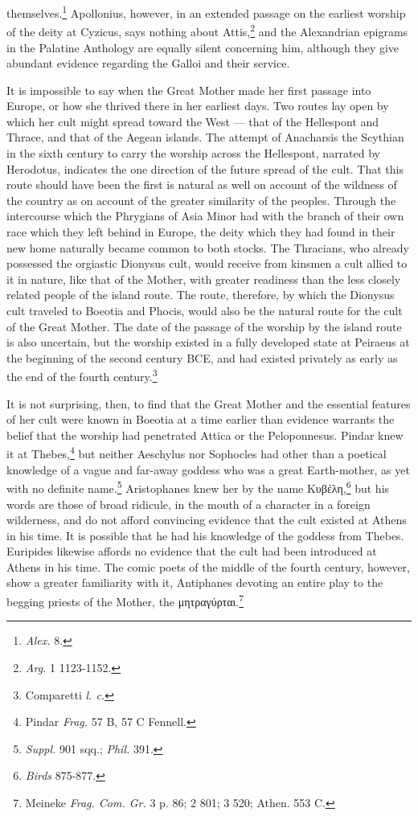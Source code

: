 \documentclass[a4paper, 11pt, oneside, polutonikogreek, english]{article}
\begin{document}
themselves.\footnote{\emph{Alex.} 8.} Apollonius, however, in an extended passage on the earliest worship of the deity at Cyzicus, says nothing about Attis,\footnote{\emph{Arg.} 1 1123-1152.} and the Alexandrian epigrams in the Palatine Anthology are equally silent concerning him, although they give abundant evidence regarding the Galloi and their service.

It is impossible to say when the Great Mother made her first passage into Europe, or how she thrived there in her earliest days. Two routes lay open by which her cult might spread toward the West --- that of the Hellespont and Thrace, and that of the Aegean islands. The attempt of Anacharsis the Scythian in the sixth century to carry the worship across the Hellespont, narrated by Herodotus, indicates the one direction of the future spread of the cult. That this route should have been the first is natural as well on account of the wildness of the country as on account of the greater similarity of the peoples. Through the intercourse which the Phrygians of Asia Minor had with the branch of their own race which they left behind in Europe, the deity which they had found in their new home naturally became common to both stocks. The Thracians, who already possessed the orgiastic Dionysus cult, would receive from kinsmen a cult allied to it in nature, like that of the Mother, with greater readiness than the less closely related people of the island route. The route, therefore, by which the Dionysus cult traveled to Boeotia and Phocis, would also be the natural route for the cult of the Great Mother. The date of the passage of the worship by the island route is also uncertain, but the worship existed in a fully developed state at Peiraeus at the beginning of the second century \textsc{BCE}, and had existed privately as early as the end of the fourth century.\footnote{Comparetti \emph{l. c.}}

It is not surprising, then, to find that the Great Mother and the essential features of her cult were known in Boeotia at a time earlier than evidence warrants the belief that the worship had penetrated Attica or the Peloponnesus. Pindar knew it at Thebes,\footnote{Pindar \emph{Frag.} 57 B, 57 C Fennell.} but neither Aeschylus nor Sophocles had other than a poetical knowledge of a vague and far-away goddess who was a great Earth-mother, as yet with no definite name.\footnote{\emph{Suppl.} 901 sqq.; \emph{Phil.} 391.} Aristophanes knew her by the name Κυβέλη,\footnote{\emph{Birds} 875-877.} but his words are those of broad ridicule, in the mouth of a character in a foreign wilderness, and do not afford convincing evidence that the cult existed at Athens in his time. It is possible that he had his knowledge of the goddess from Thebes. Euripides likewise affords no evidence that the cult had been introduced at Athens in his time. The comic poets of the middle of the fourth century, however, show a greater familiarity with it, Antiphanes devoting an entire play to the begging priests of the Mother, the μητραγύρται.\footnote{Meineke \emph{Frag. Com. Gr.} 3 p. 86; 2 801; 3 520; Athen. 553 C.}
\end{document}
